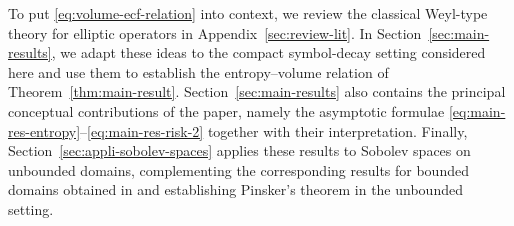 \documentclass[a4paper,12pt]{article}
\begin{document}





To put \eqref{eq:volume-ecf-relation} into context, we review the classical
Weyl-type theory for elliptic operators in Appendix~\ref{sec:review-lit}.
In Section~\ref{sec:main-results}, we adapt these ideas to the compact
symbol-decay setting considered here and use them to establish the
entropy–volume relation of Theorem~\ref{thm:main-result}. Section~\ref{sec:main-results}
also contains the principal conceptual contributions of the paper, namely the asymptotic formulae \eqref{eq:main-res-entropy}–\eqref{eq:main-res-risk-2} together with their interpretation. Finally, Section~\ref{sec:appli-sobolev-spaces} applies these results to Sobolev spaces on unbounded domains, complementing the corresponding results for bounded domains obtained in \cite[Section~3.2]{ab2025compactoperators} and establishing Pinsker’s theorem in the unbounded setting.
\end{document}
